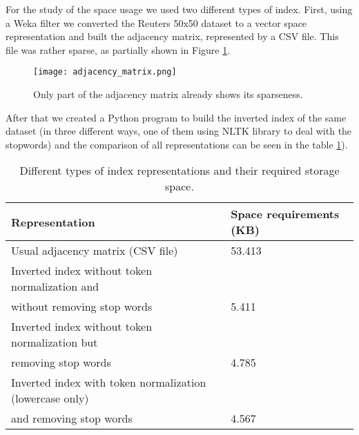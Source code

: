For the study of the space usage we used two different types of index. First, using a Weka filter we converted the Reuters 50x50 dataset \cite{reuters50x50} to a vector space representation and built the adjacency matrix, represented by a CSV file. This file was rather sparse, as partially shown in Figure \ref{adjacency_matrix}.
\begin{figure}[h!]
 \centering
 \label{adjacency_matrix}
   \texttt{[image: adjacency\_matrix.png]}
 \caption{Only part of the adjacency matrix already shows its sparseness.}
\end{figure}

After that we created a Python program to build the inverted index of the same dataset (in three different ways, one of them using NLTK library to deal with the stopwords) and the comparison of all representations can be seen in the table \ref{space_comparison}).

\begin{table}[ht]
	\label{space_comparison}
	\centering
	\caption{Different types of index representations and their required storage space.}
    \begin{tabular}{| p{7cm} | p{3cm} |}
    	\hline
		Representation & Space requirements (KB) \\ \hline
		Usual adjacency matrix (CSV file) & 53.413 \\ \hline
		Inverted index without token normalization and \\ without removing stop words & 5.411 \\ \hline
		Inverted index without token normalization but \\ removing stop words & 4.785 \\ \hline
		Inverted index with token normalization (lowercase only) \\ and removing stop words & 4.567 \\ \hline
    \end{tabular}
\end{table}

